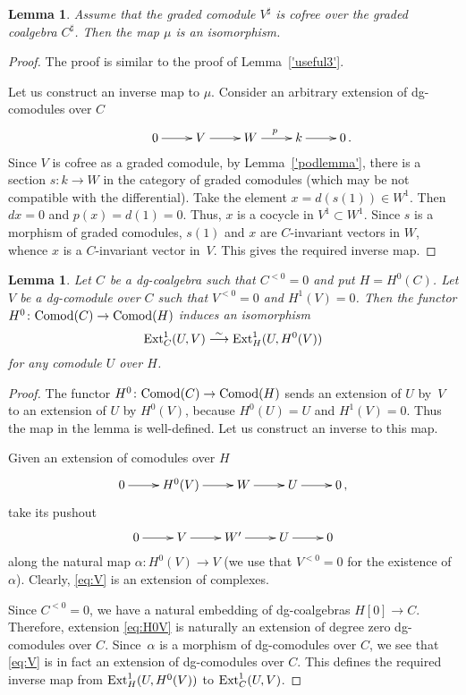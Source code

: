 \documentclass[10pt,russian]{article}
\theoremstyle{plain}
\newtheorem{lemma}[theorem]{Lemma}
\theoremstyle{definition}
\newcommand{\Comod}{{\rm Comod}}
\newcommand{\Ext}{{\rm Ext}}
\begin{document}
\begin{lemma}
\label{'useful'}
Assume that the graded comodule $V^{\sharp}$ is cofree over the graded coalgebra $C^{\sharp}$. Then the map $\mu$ is an isomorphism.
\end{lemma}
\begin{proof}
The proof is similar to the proof of Lemma~\ref{'useful3'}.

	Let us construct an inverse map to $\mu$. Consider an arbitrary extension of dg-comodules over $C$
	$$
	\xymatrix{
	 & 0 \ar[r] &  V^{} \ar[r] & W^{}  \ar[r]^{p}  &  k  \ar[r]  & 0\,.
	}
	$$
Since $V$ is cofree as a graded comodule, by Lemma~\ref{'podlemma'}, there is a section $s\colon k\to W$ in the category of graded comodules (which may be not compatible with the differential). Take the element $x=d(s(1))\in W^1$. Then $dx=0$ and $p(x)=d(1)=0$. Thus, $x$ is a cocycle in $V^1 \subset W^1$. Since $s$ is a morphism of graded comodules, $s(1)$ and $x$ are $C$-invariant vectors in $W$, whence $x$ is a $C$-invariant vector in~$V$. This gives the required inverse map.
	
\end{proof}

\begin{lemma}
	\label{'useful1'}
Let $C^{}$	be a dg-coalgebra such that $C^{ < 0} = 0$ and put $H=H^0(C)$. Let $V$ be a dg-comodule over $C$ such that $V^{<0}=0$ and $H^1(V)=0$. Then the functor ${H^0\colon \Comod(C)\to \Comod(H) }$ induces an isomorphism
	$$
	\Ext^1_{C} (U, V) \stackrel{\sim}\longrightarrow \Ext^1_{H} (U, H^{0}(V))
	$$
	for any comodule $U$ over $H$.
\end{lemma}
\begin{proof}
	The functor ${H^0\colon \Comod(C)\to \Comod(H) }$ sends an extension of $U$ by~$V$ to an extension of $U$ by $H^0(V)$, because $H^0(U) = U$ and $H^1(V)=0$. Thus the map in the lemma is well-defined. Let us construct an inverse to this map.
	
	Given an extension of comodules over $H$
	\begin{equation}
	\label{eq:H0V}
	\xymatrix{
		 0 \ar[r] &  H^0(V) \ar[r] & W  \ar[r]  &  U  \ar[r] & 0\,,
	}
	\end{equation}
take its pushout
	\begin{equation}
	\label{eq:V}
	\xymatrix{
		0 \ar[r] &  V \ar[r] & W'  \ar[r]  &  U  \ar[r] & 0
	}
\end{equation}
along the natural map $\alpha \colon H^0(V)\to V$ (we use that $V^{<0}=0$ for the existence of $\alpha$). Clearly, \eqref{eq:V} is an extension of complexes.

Since $C^{<0}=0$, we have a natural embedding of dg-coalgebras $H[0] \to C$. Therefore, extension \eqref{eq:H0V} is naturally an extension of degree zero dg-comodules over $C$. Since~$\alpha$ is a morphism of dg-comodules over $C$, we see that \eqref{eq:V} is in fact an extension of dg-comodules over $C$. This defines the required inverse map from ${\Ext^1_H(U,H^0(V))}$ to ${\Ext^1_C(U,V)}$.
\end{proof}
\end{document}
